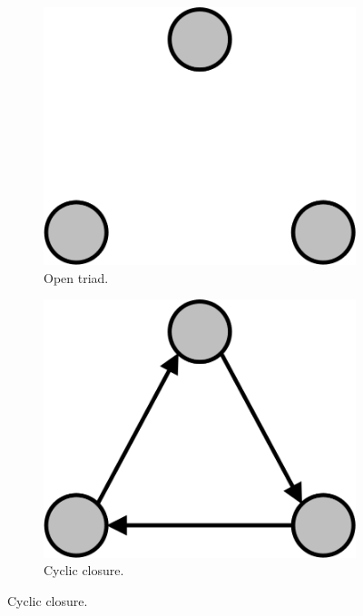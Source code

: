 \begin{figure}
\centering
\begin{subfigure}[b]{0.25\textwidth}
\includegraphics[width = \textwidth]{Images/Open_Triad.png}
\caption{Open triad.}
\end{subfigure}
\hspace{2em}
\begin{subfigure}[b]{0.25\textwidth}
\includegraphics[width = \textwidth]{Images/C_Closure.png}
\caption{Cyclic closure.}
\end{subfigure}
\hspace{2em}

\end{figure}
